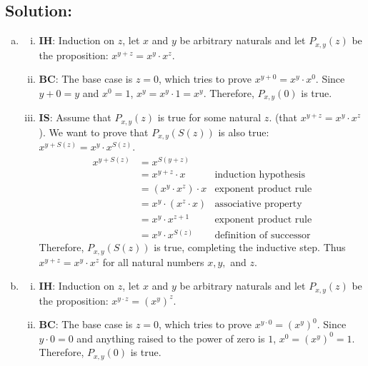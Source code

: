 \documentclass[12pt]{article}
\begin{document}
	\subsection*{\textbf{Solution:}}
	\begin{enumerate}[(a)]
		\item
			\begin{enumerate}[(i)]
				\item \textbf{IH}: Induction on $z$, let $x$ and $y$ be arbitrary
					naturals and let $P_{x,y}(z)$ be the proposition: $x^{y+z}=x^{y}\cdot x
					^{z}$.

				\item \textbf{BC}: The base case is $z=0$, which tries to prove
					$x^{y+0}=x^{y}\cdot x^{0}$. Since $y+0=y$ and $x^{0}=1$,
					$x^{y}=x^{y}\cdot 1=x^{y}$. Therefore, $P_{x,y}(0)$ is true.

				\item \textbf{IS}: Assume that $P_{x,y}(z)$ is true for some natural $z$.
					(that $x^{y+z}=x^{y}\cdot x^{z}$). We want to prove that $P_{x,y}(S(z))$
					is also true: $x^{y+S(z)}=x^{y}\cdot x^{S(z)}$.
					\begin{align*}
						x^{y+S(z)} & = x^{S(y+z)}                 \\
						           & = x^{y+z}\cdot x            & \text{induction hypothesis}    \\
						           & = (x^{y}\cdot x^{z})\cdot x & \text{exponent product rule}   \\
						           & = x^{y}\cdot(x^{z}\cdot x)  & \text{associative property}    \\
						           & = x^{y}\cdot x^{z+1}        & \text{exponent product rule}   \\
						           & = x^{y}\cdot x^{S(z)}       & \text{definition of successor}
					\end{align*}
					Therefore, $P_{x,y}(S(z))$ is true, completing the inductive step.
					Thus $x^{y+z}=x^{y}\cdot x^{z}$ for all natural numbers $x,y,$ and $z$.
			\end{enumerate}

		\item
			\begin{enumerate}[(i)]
				\item \textbf{IH}: Induction on $z$, let $x$ and $y$ be arbitrary
					naturals and let $P_{x,y}(z)$ be the proposition: $x^{y\cdot z}=(x^{y})
					^{z}$.

				\item \textbf{BC}: The base case is $z=0$, which tries to prove
					$x^{y\cdot 0}=(x^{y})^{0}$. Since $y\cdot 0=0$ and anything raised to the
					power of zero is $1$, $x^{0}=(x^{y})^{0}=1$. Therefore, $P_{x,y}(0)$
					is true.


\end{enumerate}
\end{enumerate}
\end{document}
